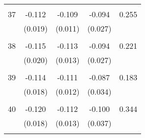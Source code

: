 \begin{tabular}{l*{1}{cccc}}
 & & & &\\
  37       & -0.112 & -0.109 & -0.094 & 0.255 \\
          & (0.019) & (0.011) & (0.027) & \\
 & & & &\\
  38       & -0.115 & -0.113 & -0.094 & 0.221 \\
          & (0.020) & (0.013) & (0.027) & \\
 & & & &\\
  39       & -0.114 & -0.111 & -0.087 & 0.183 \\
          & (0.018) & (0.012) & (0.034) & \\
 & & & &\\
  40       & -0.120 & -0.112 & -0.100 & 0.344 \\
          & (0.018) & (0.013) & (0.037) & \\
 & & & &\\
\hline\hline
\end{tabular}
